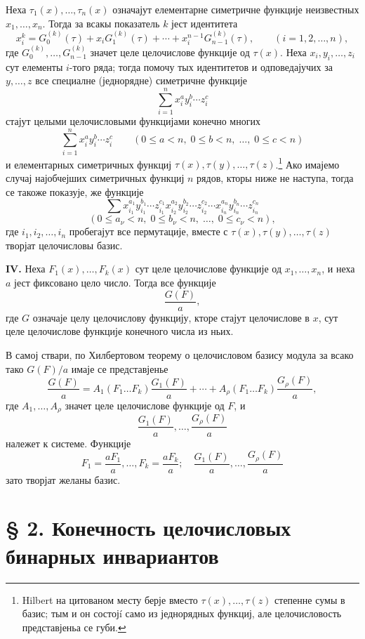 ﻿\documentclass[11pt]{article}
\begin{document}
Неха \(\tau_1(x),\ldots,\tau_n(x)\) означајут елементарне симетричне функције неизвестных \(x_1,\ldots,x_n\). Тогда за всакы показатель \(k\) јест идентитета
\[
        x_i^k = G_0^{(k)}(\tau)+x_iG_1^{(k)}(\tau)+\cdots+x_i^{n-1}G_{n-1}^{(k)}(\tau),
        \qquad (i=1,2,\ldots,n),
\]
где \(G_0^{(k)},\ldots,G_{n-1}^{(k)}\) значет целе целочислове функције од \(\tau(x)\). Неха \(x_i,y_i,\ldots,z_i\) сут елементы \(i\)-того ряда; тогда помочу тых идентитетов и одповедајучих за \(y,\ldots,z\) все специалне (једнорядне) симетричне функције
\[
        \sum_{i=1}^n x_i^{a}y_i^{b}\cdots z_i^{c}
\]
стајут целыми целочисловыми функцијами конечно многих
\[
        \sum_{i=1}^n x_i^{a}y_i^{b}\cdots z_i^{c}
        \qquad
        (0\le a<n,\;0\le b<n,\;\ldots,\;0\le c<n)
\]
и елементарных симетричных функциј \(\tau(x),\tau(y),\ldots,\tau(z)\).\footnote{Hilbert на цитованом месту берје вместо \(\tau(x),\ldots,\tau(z)\) степенне сумы в базис; тым и он состојí само из једнорядных функциј, але целочисловость представјеньа се губи.}
Ако имајемо случај најобчејших симетричных функциј \(n\) рядов, кторы ниже не наступа, тогда се такоже показује, же функције
\[
        \sum x_{i_1}^{a_1}y_{i_1}^{b_1}\cdots z_{i_1}^{c_1}
              x_{i_2}^{a_2}y_{i_2}^{b_2}\cdots z_{i_2}^{c_2}
              \cdots
              x_{i_n}^{a_n}y_{i_n}^{b_n}\cdots z_{i_n}^{c_n}
\]
\[
        (0\le a_\nu<n,\;0\le b_\nu<n,\;\ldots,\;0\le c_\nu<n),
\]
где \(i_1,i_2,\ldots,i_n\) пробегајут все пермутације, вместе с \(\tau(x),\tau(y),\ldots,\tau(z)\) творјат целочисловы базис.

\textbf{IV.} Неха \(F_1(x),\ldots,F_k(x)\) сут целе целочислове функције од \(x_1,\ldots,x_n\), и неха \(a\) јест фиксовано цело число. Тогда все функције
\[
        \frac{G(F)}{a},
\]
где \(G\) означаје целу целочислову функцију, кторе стајут целочислове в \(x\), сут целе целочислове функције конечного числа из ньих.

В самој ствари, по Хилбертовом теорему о целочисловом базису модула за всако тако \(G(F)/a\) имаје се представјенье
\[
 \frac{G(F)}{a}
 =
 A_1(F_1\ldots F_k)\frac{G_1(F)}{a}
 +\cdots+
 A_\rho(F_1\ldots F_k)\frac{G_\rho(F)}{a},
\]
где \(A_1,\ldots,A_\rho\) значет целе целочислове функције од \(F\), и
\[
        \frac{G_1(F)}{a},\ldots,\frac{G_\rho(F)}{a}
\]
належет к системе. Функције
\[
        F_1=\frac{aF_1}{a},\ldots,F_k=\frac{aF_k}{a};
        \quad
        \frac{G_1(F)}{a},\ldots,\frac{G_\rho(F)}{a}
\]
зато творјат желаны базис.

\setcounter{equation}{0}
\section*{§ 2. Конечность целочисловых бинарных инвариантов}
\end{document}

